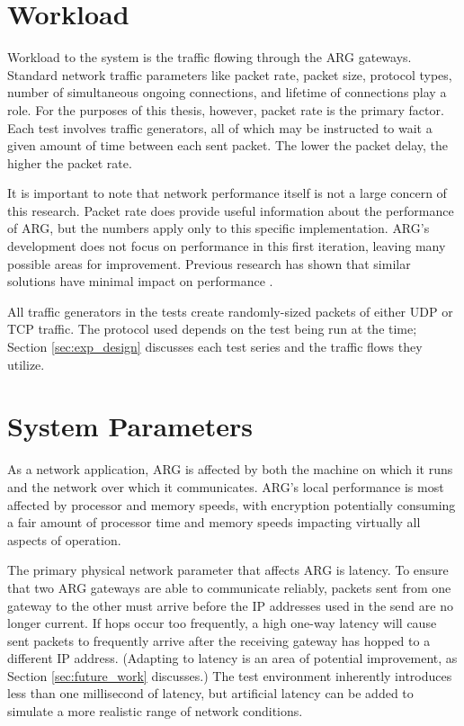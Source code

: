 \section{Workload}
\label{sec:workload}
\par Workload to the system is the traffic flowing through the \ac{ARG} gateways. Standard network traffic parameters like packet rate, packet size, protocol types, number of simultaneous ongoing connections, and lifetime of connections play a role. For the purposes of this thesis, however, packet rate is the primary factor. Each test involves traffic generators, all of which may be instructed to wait a given amount of time between each sent packet. The lower the packet delay, the higher the packet rate.

\par It is important to note that network performance itself is not a large concern of this research. Packet rate does provide useful information about the performance of \ac{ARG}, but the numbers apply only to this specific implementation. \ac{ARG}'s development does not focus on performance in this first iteration, leaving many possible areas for improvement. Previous research has shown that similar solutions have minimal impact on performance \cite{NAH}. 

\par All traffic generators in the tests create randomly-sized packets of either \ac{UDP} or \ac{TCP} traffic. The protocol used depends on the test being run at the time; Section \ref{sec:exp_design} discusses each test series and the traffic flows they utilize.

\section{System Parameters}
\label{sec:parameters}
\par As a network application, \ac{ARG} is affected by both the machine on which it runs and the network over which it communicates. \ac{ARG}'s local performance is most affected by processor and memory speeds, with encryption potentially consuming a fair amount of processor time and memory speeds impacting virtually all aspects of operation.

\par The primary physical network parameter that affects \ac{ARG} is latency. To ensure that two \ac{ARG} gateways are able to communicate reliably, packets sent from one gateway to the other must arrive before the \ac{IP} addresses used in the send are no longer current. If hops occur too frequently, a high one-way latency will cause sent packets to frequently arrive after the receiving gateway has hopped to a different \ac{IP} address. (Adapting to latency is an area of potential improvement, as Section \ref{sec:future_work} discusses.) The test environment inherently introduces less than one millisecond of latency, but artificial latency can be added to simulate a more realistic range of network conditions.

